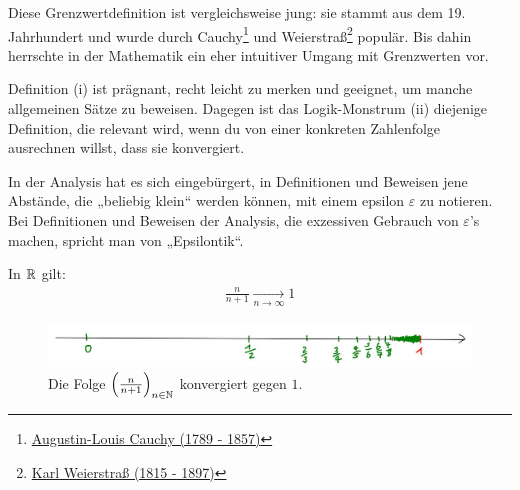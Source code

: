 \begin{bem} 
    Diese Grenzwertdefinition ist vergleichsweise jung: sie stammt aus dem 19. Jahrhundert und wurde durch Cauchy\footnote{\href{https://de.wikipedia.org/wiki/Augustin-Louis_Cauchy}{Augustin-Louis Cauchy (1789 - 1857)}} und Weierstraß\footnote{\href{https://de.wikipedia.org/wiki/Karl_Weierstra\%C3\%9F}{Karl Weierstraß (1815 - 1897)}} populär. Bis dahin herrschte in der Mathematik ein eher intuitiver Umgang mit Grenzwerten vor.
    
    Definition (i) ist prägnant, recht leicht zu merken und geeignet, um manche allgemeinen Sätze zu beweisen. Dagegen ist das Logik-Monstrum (ii) diejenige Definition, die relevant wird, wenn du von einer konkreten Zahlenfolge ausrechnen willst, dass sie konvergiert.
    
    In der Analysis hat es sich eingebürgert, in Definitionen und Beweisen jene Abstände, die „beliebig klein“ werden können, mit einem epsilon $\varepsilon$ zu notieren. Bei Definitionen und Beweisen der Analysis, die exzessiven Gebrauch von $\varepsilon$'s machen, spricht man von „Epsilontik“.
\end{bem}


\begin{bsp} \label{bsp:konvergenz}
    In $\mathbb R$ gilt:
    \begin{align*}
        \frac{n}{n+1} \xrightarrow[n\to\infty]{} 1
    \end{align*}
\end{bsp}


\begin{figure}[ht]
    \includegraphics[width=14cm]{./_img/Konvergenzbsp.jpeg}
    \centering \caption{Die Folge $\left(\frac{n}{n+1}\right)_{n\in \mathbb N}$ konvergiert gegen $1$.}
\end{figure}


